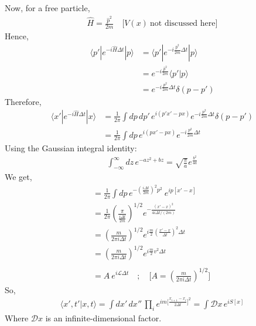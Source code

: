 \documentclass[14pt]{article} %
\begin{document}
Now, for a free particle,
\begin{align*}
\hat{H} = \frac{\hat{p}^2}{2m} \quad \big[ V(x) ~\text{not discussed here} \big]
\end{align*}
Hence,
\begin{align*}
\langle p' | e^{-i \hat{H} \Delta t} | p \rangle &= \langle p' | e^{-i \frac{\hat{p}^2}{2m} \Delta t} | p \rangle\\
&= e^{-i \frac{\hat{p}^2}{2m}} \langle p'|p \rangle \\
&= e^{-i \frac{p^2}{2m} \Delta t} \delta(p - p')
\end{align*}
Therefore,
\begin{align*}
\langle x' | e^{-i \hat{H} \Delta t} | x \rangle &= \frac{1}{2\pi} \int dp \, dp' \, e^{i(p' x' - p x)} e^{-i \frac{p^2}{2m} \Delta t} \delta(p - p') \\
&= \frac{1}{2\pi} \int dp \, e^{i (p x' - px)} e^{-i \frac{p^2}{2m} \Delta t}
\end{align*}
Using the Gaussian integral identity:
\begin{align*}
\int_{-\infty}^{\infty} dz \, e^{-a z^2 + b z} = \sqrt{\frac{\pi}{a}} e^{\frac{b^2}{4a}}
\end{align*}
We get,
\begin{align*}
&= \frac{1}{2\pi} \int dp \,e^{- {(\frac{i \Delta t}{2m})}^2 p^2} ~ e^{ ip [ x' -x ] } \\
&= \frac{1}{2\pi} \left( \frac{\pi}{\frac{i \Delta t}{2m}} \right)^{1/2} 
e^{- \frac{(x' - x)^2}{4 i \Delta t / (2m)}} \\
&= \left( \frac{m}{2 \pi i \Delta t} \right)^{1/2} 
e^{i \frac{m}{2} {\left( \frac{x' - x}{\Delta t} \right)}^2 \Delta t} \\
&= \left( \frac{m}{2 \pi i \Delta t} \right)^{1/2} 
e^{i \frac{m}{2} v^2 \Delta t} \\\\
&= A ~ e^{ i \mathcal{L} \Delta t } \quad ; \quad \big[ A= \left( \frac{m}{2 \pi i \Delta t} \right)^{1/2} \big] \quad
\end{align*}
So,
\begin{align*}
\langle x', t' | x, t \rangle = \int dx'\,dx'' \, \prod_i e^{{i m \big[\frac{x_{i+1} - x_i}{2 \Delta t}}\big]^2} = \int \mathcal{D}x \, e^{i S[x]}
\end{align*}
Where $\mathcal{D}x$ is an infinite-dimensional factor.

\newpage
\end{document}
